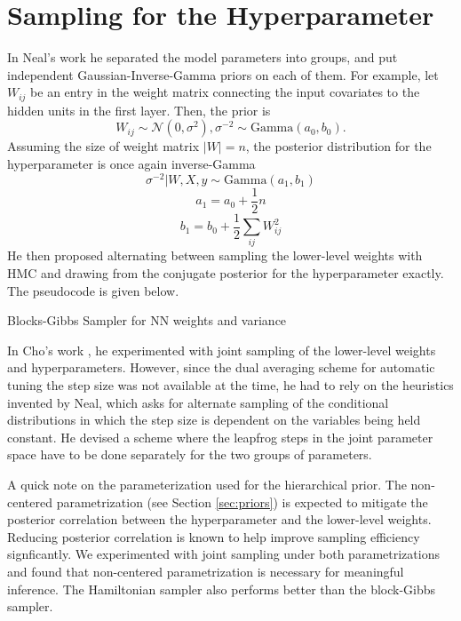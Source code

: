 \documentclass[12pt]{report}
\begin{document}
\section{Sampling for the Hyperparameter}

In Neal's work \cite{neal2012bayesian} he separated the model parameters into groups, and put independent Gaussian-Inverse-Gamma priors on each of them. For example, let $W_{ij}$ be an entry in the weight matrix connecting the input covariates to the hidden units in the first layer. Then, the prior is 
\[W_{ij} \sim \mathcal{N}(0,\sigma^2), \sigma^{-2} \sim \text{Gamma}(a_0,b_0). \]
Assuming the size of weight matrix  $|W|=n $, the posterior distribution for the hyperparameter is once again inverse-Gamma
\[\sigma^{-2}|W,X,y \sim \text{Gamma}(a_1,b_1)\]
\[a_1 = a_0 + \frac{1}{2} n  \]
\[b_1 = b_0 + \frac{1}{2} \sum_{ij} W_{ij}^2 \]
He then proposed alternating between sampling the lower-level weights with HMC and drawing from the conjugate posterior for the hyperparameter exactly. The pseudocode is given below.
\begin{algorithm}

\caption{Blocks-Gibbs Sampler for NN weights and variance}
\end{algorithm}

In Cho's work \cite{choo2000learning}, he experimented with joint sampling of the lower-level weights and hyperparameters. However, since the dual averaging scheme for automatic tuning the step size was not available at the time, he had to rely on the heuristics invented by Neal, which asks for alternate sampling of the conditional distributions in which the step size is dependent on the variables being held constant. He devised a scheme where the leapfrog steps in the joint parameter space have to be done separately for the two groups of parameters. 

A quick note on the parameterization used for the hierarchical prior. The non-centered parametrization (see Section \ref{sec:priors}) is expected to mitigate the posterior correlation between the hyperparameter and the lower-level weights. Reducing posterior correlation is known to help improve sampling efficiency signficantly. We experimented with joint sampling under both parametrizations and found that non-centered parametrization is necessary for meaningful inference. The Hamiltonian sampler also performs better than the block-Gibbs sampler.
\end{document}
